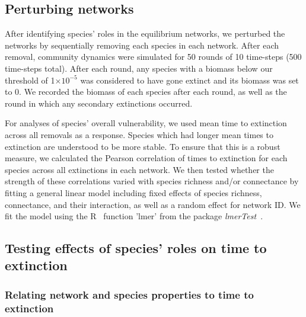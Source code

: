 \documentclass[12pt]{article}
\begin{document}
	\subsection*{Perturbing networks}

		After identifying species' roles in the equilibrium networks, we perturbed the networks by sequentially removing each species in each network. After each removal, community dynamics were simulated for 50 rounds of 10 time-steps (500 time-steps total). After each round, any species with a biomass below our threshold of 1$\times10^{-5}$ was considered to have gone extinct and its biomass was set to 0. We recorded the biomass of each species after each round, as well as the round in which any secondary extinctions occurred.


		For analyses of species' overall vulnerability, we used mean time to extinction across all removals as a response. Species which had longer mean times to extinction are understood to be more stable. To ensure that this is a robust measure, we calculated the Pearson correlation of times to extinction for each species across all extinctions in each network. We then tested whether the strength of these correlations varied with species richness and/or connectance by fitting a general linear model including fixed effects of species richness, connectance, and their interaction, as well as a random effect for network ID. We fit the model using the R~\citep{R} function 'lmer' from the package \emph{lmerTest}~\citep{lmerTest}.


	\subsection*{Testing effects of species' roles on time to extinction}

		\subsubsection*{Relating network and species properties to time to extinction}
\end{document}
